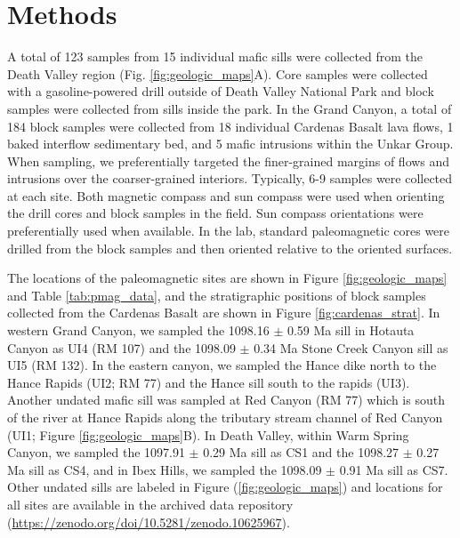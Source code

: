 \section{Methods}

A total of 123 samples from 15 individual mafic sills were collected from the Death Valley region (Fig. \ref{fig:geologic_maps}A). Core samples were collected with a gasoline-powered drill outside of Death Valley National Park and block samples were collected from sills inside the park. In the Grand Canyon, a total of 184 block samples were collected from 18 individual Cardenas Basalt lava flows, 1 baked interflow sedimentary bed, and 5 mafic intrusions within the Unkar Group. When sampling, we preferentially targeted the finer-grained margins of flows and intrusions over the coarser-grained interiors. Typically, 6-9 samples were collected at each site. Both magnetic compass and sun compass were used when orienting the drill cores and block samples in the field. Sun compass orientations were preferentially used when available. In the lab, standard paleomagnetic cores were drilled from the block samples and then oriented relative to the oriented surfaces.

The locations of the paleomagnetic sites are shown in Figure \ref{fig:geologic_maps} and Table \ref{tab:pmag_data}, and the stratigraphic positions of block samples collected from the Cardenas Basalt are shown in Figure \ref{fig:cardenas_strat}. In western Grand Canyon, we sampled the 1098.16 $\pm$ 0.59 Ma sill in Hotauta Canyon as UI4 (RM 107) and the 1098.09 $\pm$ 0.34 Ma Stone Creek Canyon sill as UI5 (RM 132). In the eastern canyon, we sampled the Hance dike north to the Hance Rapids (UI2; RM 77) and the Hance sill south to the rapids (UI3). Another undated mafic sill was sampled at Red Canyon (RM 77) which is south of the river at Hance Rapids along the tributary stream channel of Red Canyon (UI1; Figure \ref{fig:geologic_maps}B). In Death Valley, within Warm Spring Canyon, we sampled the 1097.91 $\pm$ 0.29 Ma sill as CS1 and the 1098.27 $\pm$ 0.27 Ma sill as CS4, and in Ibex Hills, we sampled the 1098.09 $\pm$ 0.91 Ma sill as CS7. Other undated sills are labeled in Figure (\ref{fig:geologic_maps}) and locations for all sites are available in the archived data repository (\url{https://zenodo.org/doi/10.5281/zenodo.10625967}). 

